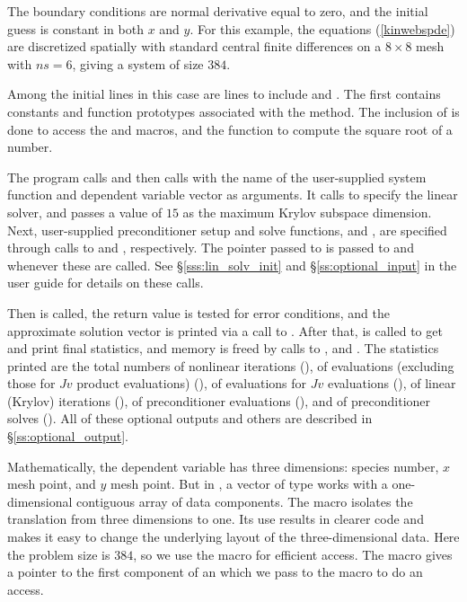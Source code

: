The boundary conditions are normal derivative equal to zero, and the initial
guess is constant in both $x$ and $y$. For this example, the equations
(\ref{kinwebspde}) are discretized spatially with standard central finite
differences on a $8 \times 8$ mesh with $ns = 6$, giving a system of size $384$.

Among the initial  lines in this case are lines to
include  and .  The first contains
constants and function prototypes associated with the {\spgmr} method.
The inclusion of  is done to access the  and
 macros, and the  function to compute the square root
of a  number.

The  program calls  and then calls  with the
name of the user-supplied system function and dependent variable vector as
arguments. It calls   to specify the {\kinspgmr} linear solver, and
passes a  value of $15$ as the maximum Krylov subspace dimension.
Next, user-supplied preconditioner setup and solve functions,  and
, are specified through calls to  and
, respectively. The  pointer passed to
 is passed to  and  whenever
these are called. See \S\ref{sss:lin_solv_init} and \S\ref{ss:optional_input} in
the user guide for details on these calls.

Then  is called, the return value is tested for error conditions, and
the approximate solution vector is printed via a call to .
After that,  is called to get and print final statistics, and
memory is freed by calls to ,  and .
The statistics printed are the total numbers of nonlinear iterations (),
of  evaluations (excluding those for $Jv$ product evaluations) (),
of  evaluations for $Jv$ evaluations (), of linear (Krylov)
iterations (), of preconditioner evaluations (), and of
preconditioner solves (). All of these optional outputs and others are
described in \S\ref{ss:optional_output}.

Mathematically, the dependent variable has three dimensions: species
number, $x$ mesh point, and $y$ mesh point.  But in {\nvecs}, a vector of
type  works with a one-dimensional contiguous array of
data components. The macro  isolates the translation from
three dimensions to one. Its use results in clearer code and makes it
easy to change the underlying layout of the three-dimensional data. 
Here the problem size is $384$, so we use the  macro
for efficient  access. The  macro gives
a pointer to the first component of an  which we pass to
the  macro to do an  access.

